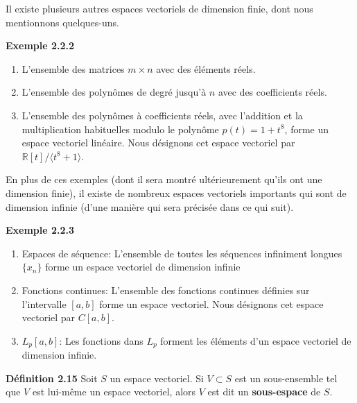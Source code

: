\documentclass[11pt,twoside,a4paper]{article}
\begin{document}
\noindent
Il existe plusieurs autres espaces vectoriels de dimension finie, dont nous mentionnons quelques-uns.
\vspace{4mm}

\noindent
\textbf{Exemple 2.2.2}

\begin{enumerate}
  \item L'ensemble des matrices $m \times n$ avec des éléments réels.
  \item L'ensemble des polynômes de degré jusqu'à $n$ avec des coefficients réels.
  \item L'ensemble des polynômes à coefficients réels, avec l'addition et la multiplication habituelles modulo le polynôme $p(t) = 1 + t^8$, forme un espace vectoriel linéaire. 
  Nous désignons cet espace vectoriel par $\mathbb{R}[t]/ \langle t^8 + 1 \rangle$.
\end{enumerate}
\vspace{4mm}

\noindent
En plus de ces exemples (dont il sera montré ultérieurement qu'ils ont une dimension finie), il existe de nombreux espaces vectoriels importants qui sont de dimension infinie (d'une manière qui sera précisée dans ce qui suit).
\vspace{4mm}

\noindent
\textbf{Exemple 2.2.3}

\begin{enumerate}
  \item Espaces de séquence: L'ensemble de toutes les séquences infiniment longues $\{x_n\}$ forme un espace vectoriel de dimension infinie
  \item Fonctions continues: L'ensemble des fonctions continues définies sur l'intervalle $[a, b]$ forme un espace vectoriel. Nous désignons cet espace vectoriel par $C[a, b]$.
  \item $L_p[a, b]$: Les fonctions dans $L_p$ forment les éléments d'un espace vectoriel de dimension infinie.
\end{enumerate}
\vspace{4mm}

\noindent
\textbf{Définition 2.15} Soit $S$ un espace vectoriel. Si $V \subset S$ est un sous-ensemble tel que $V$ est lui-même un espace vectoriel, alors $V$ est dit un \textbf{sous-espace} de $S$.
\end{document}
